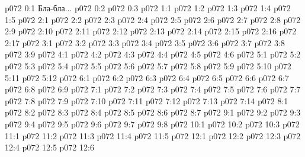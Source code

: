 \author{Мелхиседек}
\vs p072 0:1  Бла-бла...
\vs p072 0:2 
\vs p072 0:3 
\vs p072 1:1 
\vs p072 1:2 
\vs p072 1:3 
\vs p072 1:4 \pc 
\vs p072 1:5 
\vs p072 2:1 
\vs p072 2:2 
\vs p072 2:3 
\vs p072 2:4 \pc 
\vs p072 2:5 
\vs p072 2:6 
\vs p072 2:7 
\vs p072 2:8 \pc 
\vs p072 2:9 \pc 
\vs p072 2:10 
\vs p072 2:11 
\vs p072 2:12 
\vs p072 2:13 \pc 
\vs p072 2:14 
\vs p072 2:15 
\vs p072 2:16 
\vs p072 2:17 \pc 
{}
\vs p072 3:1 
\vs p072 3:2 
\vs p072 3:3 
\vs p072 3:4 \pc 
\vs p072 3:5 
\vs p072 3:6 
\vs p072 3:7 \pc 
\vs p072 3:8 
\vs p072 3:9 
\vs p072 4:1 
\vs p072 4:2 \pc 
\vs p072 4:3 \pc 
\vs p072 4:4 
\vs p072 4:5 
\vs p072 4:6 
\vs p072 5:1 
\vs p072 5:2 
\vs p072 5:3 \pc 
\vs p072 5:4 
\vs p072 5:5 
\vs p072 5:6 
\vs p072 5:7 
\vs p072 5:8 \pc 
\vs p072 5:9 \pc 
\vs p072 5:10 \pc 
\vs p072 5:11 
\vs p072 5:12 
\vs p072 6:1 
\vs p072 6:2 
\vs p072 6:3 \pc 
\vs p072 6:4 
\vs p072 6:5 
\vs p072 6:6 
\vs p072 6:7 
\vs p072 6:8 \pc 
\vs p072 6:9 
\vs p072 7:1 
\vs p072 7:2 
\vs p072 7:3 \pc 
\vs p072 7:4 
\vs p072 7:5 
\vs p072 7:6 \pc 
\vs p072 7:7 
\vs p072 7:8 \pc 
\vs p072 7:9 
\vs p072 7:10 
\vs p072 7:11 
\vs p072 7:12 
\vs p072 7:13 
\vs p072 7:14 \pc 
{}
\vs p072 8:1 
\vs p072 8:2 
\vs p072 8:3 
\vs p072 8:4 
\vs p072 8:5 
\vs p072 8:6 
\vs p072 8:7 
\vs p072 9:1 
\vs p072 9:2 
\vs p072 9:3 
\vs p072 9:4 
\vs p072 9:5 
\vs p072 9:6 
\vs p072 9:7 \pc 
\vs p072 9:8 
\vs p072 10:1 
\vs p072 10:2 
\vs p072 10:3 
\vs p072 11:1 
\vs p072 11:2 
\vs p072 11:3 
\vs p072 11:4 \pc 
\vs p072 11:5 
\vs p072 12:1 
\vs p072 12:2 
\vs p072 12:3 \pc 
\vs p072 12:4 \pc 
\vs p072 12:5 
\vsetoff
\vs p072 12:6 
\quizlink

